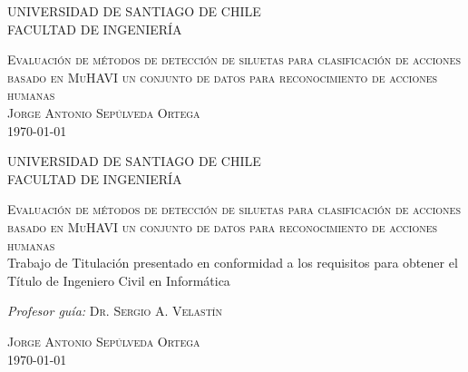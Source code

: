 \begin{titlepage}
\begin{center}
\textsc{UNIVERSIDAD DE SANTIAGO DE CHILE}\\ 
\textsc{FACULTAD DE INGENIERÍA}\\ 
\null %
\null
\null


\vspace*{\fill}
\textsc{Evaluación de métodos de detección de siluetas para clasificación de acciones basado en MuHAVI un conjunto de datos para reconocimiento de acciones humanas}\\[0.5cm]
\vspace*{\fill}
\vfill
\textsc{Jorge Antonio Sepúlveda Ortega}\\ %
{\large \today}  %
\end{center}
\end{titlepage}
\newpage\thispagestyle{empty}\mbox{}

\begin{titlepage}
\begin{center}
\textsc{UNIVERSIDAD DE SANTIAGO DE CHILE}\\ 
\textsc{FACULTAD DE INGENIERÍA}\\ 
\null %

\null
\null
\vfill


\vspace*{\fill}
\textsc{Evaluación de métodos de detección de siluetas para clasificación de acciones basado en MuHAVI un conjunto de datos para reconocimiento de acciones humanas}\\[0.5cm]
Trabajo de Titulación presentado en conformidad a los requisitos  para obtener el Título de Ingeniero Civil en Informática
\vspace*{\fill}

\begin{minipage}[c]{0.5 \textwidth}
\begin{flushright}
\emph{Profesor guía:} \textsc{Dr. Sergio A. Velastín}
\end{flushright}
\end{minipage}


\vfill
\textsc{Jorge Antonio Sepúlveda Ortega}\\ %
{\large \today} %
\end{center}
\end{titlepage}

\newpage\thispagestyle{empty}\mbox{}
\restoregeometry
